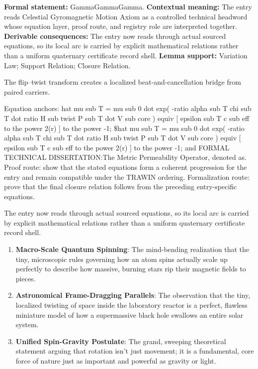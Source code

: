 \begingroup\footnotesize\setlength{\emergencystretch}{3em}\sloppy
\textbf{Formal statement:} GammaGammaGamma. \textbf{Contextual meaning:} The entry reads Celestial Gyromagnetic Motion Axiom as a controlled technical headword whose equation layer, proof route, and registry role are interpreted together. \textbf{Derivable consequences:} The entry now reads through actual sourced equations, so its local arc is carried by explicit mathematical relations rather than a uniform quaternary certificate record shell. \textbf{Lemma support:} Variation Law; Support Relation; Closure Relation.\par
\endgroup

The flip--twist transform creates a localized beat-and-cancellation bridge from paired carriers.

Equation anchors: hat mu sub T = mu sub 0 dot exp( -ratio alpha sub T chi sub T dot ratio H sub twist P sub T dot V sub core ) equiv [ epsilon sub T c sub eff to the power 2(r) ] to the power -1; \$hat mu sub T = mu sub 0 dot exp( -ratio alpha sub T chi sub T dot ratio H sub twist P sub T dot V sub core ) equiv [ epsilon sub T c sub eff to the power 2(r) ] to the power -1; and FORMAL TECHNICAL DISSERTATION:The Metric Permeability Operator, denoted as. Proof route: show that the stated equations form a coherent progression for the entry and remain compatible under the TRAWIN ordering. Formalization route: prove that the final closure relation follows from the preceding entry-specific equations.

The entry now reads through actual sourced equations, so its local arc is carried by explicit mathematical relations rather than a uniform quaternary certificate record shell.
\endgroup

\begin{enumerate}[leftmargin=1.6em,itemsep=6pt,topsep=4pt]
\item \textbf{Macro-Scale Quantum Spinning}: The mind-bending realization that the tiny, microscopic rules governing how an atom spins actually scale up perfectly to describe how massive, burning stars rip their magnetic fields to pieces.
\item \textbf{Astronomical Frame-Dragging Parallels}: The observation that the tiny, localized twisting of space inside the laboratory reactor is a perfect, flawless miniature model of how a supermassive black hole swallows an entire solar system.
\item \textbf{Unified Spin-Gravity Postulate}: The grand, sweeping theoretical statement arguing that rotation isn't just movement; it is a fundamental, core force of nature just as important and powerful as gravity or light.
\end{enumerate}

